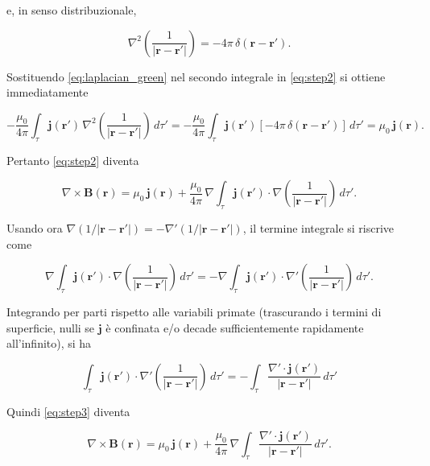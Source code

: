 e, in senso distribuzionale,

\begin{equation}\label{eq:laplacian_green}
    \nabla^2\!\left(\frac{1}{|\mathbf r-\mathbf r'|}\right)
    = -4\pi\,\delta(\mathbf r-\mathbf r').
\end{equation}

Sostituendo \ref{eq:laplacian_green} nel secondo integrale in \ref{eq:step2} si ottiene immediatamente

\begin{equation}
    -\frac{\mu_0}{4\pi}\int_{\tau}\mathbf j(\mathbf r')\,\nabla^2\!\left(\frac{1}{|\mathbf r-\mathbf r'|}\right)\,d\tau'
    =
    -\frac{\mu_0}{4\pi}\int_{\tau}\mathbf j(\mathbf r')\left[-4\pi\,\delta(\mathbf r-\mathbf r')\right]\,d\tau'
    =
    \mu_0\,\mathbf j(\mathbf r).
\end{equation}

Pertanto \ref{eq:step2} diventa

\begin{equation}\label{eq:step3}
    \nabla \times \mathbf B(\mathbf r)
    =
    \mu_0\,\mathbf j(\mathbf r)
    +\frac{\mu_0}{4\pi}\,
    \nabla \int_{\tau}\mathbf j(\mathbf r')\cdot \nabla\!\left(\frac{1}{|\mathbf r-\mathbf r'|}\right)\,d\tau'.
\end{equation}

Usando ora $\nabla(1/|\mathbf r-\mathbf r'|)=-\nabla'(1/|\mathbf r-\mathbf r'|)$, il termine integrale si riscrive come

\begin{equation}
    \nabla \int_{\tau}\mathbf j(\mathbf r')\cdot \nabla\!\left(\frac{1}{|\mathbf r-\mathbf r'|}\right)\,d\tau'
    =
    -\nabla \int_{\tau}\mathbf j(\mathbf r')\cdot \nabla'\!\left(\frac{1}{|\mathbf r-\mathbf r'|}\right)\,d\tau'.
\end{equation}

Integrando per parti rispetto alle variabili primate (trascurando i termini di superficie, nulli se $\mathbf j$ è confinata e/o decade sufficientemente rapidamente all'infinito), si ha

\begin{equation*}
    \int_{\tau}\mathbf j(\mathbf r')\cdot \nabla'\!\left(\frac{1}{|\mathbf r-\mathbf r'|}\right)\,d\tau'
    =
    -\int_{\tau}\frac{\nabla'\cdot \mathbf j(\mathbf r')}{|\mathbf r-\mathbf r'|}\,d\tau'
\end{equation*}

Quindi \ref{eq:step3} diventa

\begin{equation}\label{eq:ampere_general}
    \nabla \times \mathbf B(\mathbf r)
    =
    \mu_0\,\mathbf j(\mathbf r)
    +\frac{\mu_0}{4\pi}\,
    \nabla \int_{\tau}\frac{\nabla'\cdot \mathbf j(\mathbf r')}{|\mathbf r-\mathbf r'|}\,d\tau'.
\end{equation}

